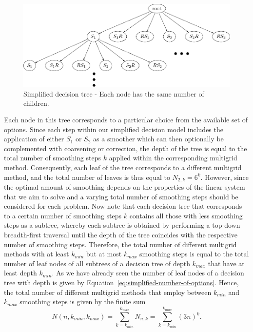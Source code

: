 \begin{figure}
	\centering
	\includegraphics[width=\textwidth]{figures/trees/decision_tree_annotated.pdf}
	\caption{Simplified decision tree - Each node has the same number of children.}
	\label{fig:decision-tree}
\end{figure}
Each node in this tree corresponds to a particular choice from the available set of options.
Since each step within our simplified decision model includes the application of either $S_1$ or $S_2$ as a smoother which can then optionally be complemented with coarsening or correction, the depth of the tree is equal to the total number of smoothing steps $k$ applied within the corresponding multigrid method.
Consequently, each leaf of the tree corresponds to a different multigrid method, and the total number of leaves is thus equal to $N_{2,k} = 6^k$.
However, since the optimal amount of smoothing depends on the properties of the linear system that we aim to solve and a varying total number of smoothing steps should be considered for each problem.
Now note that each decision tree that corresponds to a certain number of smoothing steps $k$ contains all those with less smoothing steps as a subtree, whereby each subtree is obtained by performing a top-down breadth-first traversal until the depth of the tree coincides with the respective number of smoothing steps.
Therefore, the total number of different multigrid methods with at least $k_{min}$ but at most $k_{max}$ smoothing steps is equal to the total number of leaf nodes of all subtrees of a decision tree of depth $k_{max}$ that have at least depth $k_{min}$.
As we have already seen the number of leaf nodes of a decision tree with depth is given by Equation~\ref{eq:simplified-number-of-options}.
Hence, the total number of different multigrid methods that employ between $k_{min}$ and $k_{max}$ smoothing steps is given by the finite sum
\begin{equation}
	N(n, k_{min}, k_{max}) = \sum_{k = k_{min}}^{k_{max}} N_{n,k} = \sum_{k = k_{min}}^{k_{max}} (3 n)^k.
	\label{eq:search-space-estimation}
\end{equation}
